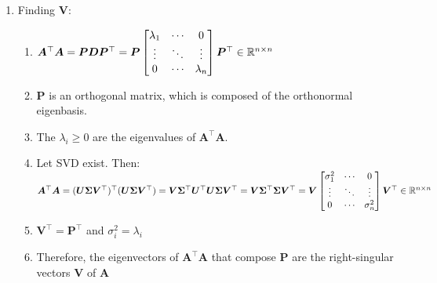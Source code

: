 \begin{enumerate}
    \item Finding $\bm{V}$:
    \begin{enumerate}
        \item $
            \bm{A}^\top \bm{A}
            = \bm{PDP} ^\top
            = \bm{P} \begin{bmatrix}
                \lambda_1 & \cdots & 0 \\
                \vdots & \ddots & \vdots \\
                0 & \cdots & \lambda_n
            \end{bmatrix} \bm{P} ^\top
            \in \mathbb{R}^{n\times n}
        $
        \hfill \cite{mfml/book/mml/Deisenroth-Faisal-Ong}

        \item $\bm{P}$ is an orthogonal matrix, which is composed of the orthonormal eigenbasis.
        \hfill \cite{mfml/book/mml/Deisenroth-Faisal-Ong}

        \item The $\lambda_i \geq 0$ are the eigenvalues of $\bm{A}^\top \bm{A}$.
        \hfill \cite{mfml/book/mml/Deisenroth-Faisal-Ong}

        \item Let SVD exist. Then:
        \hfill \cite{mfml/book/mml/Deisenroth-Faisal-Ong}
        \\
        $
            \bm{A}^\top \bm{A}
            = (\bm{U\Sigma V}^\top)^\top (\bm{U\Sigma V}^\top)
            = \bm{V} \bm{\Sigma}^\top \bm{U}^\top \bm{U\Sigma V}^\top
            = \bm{V} \bm{\Sigma}^\top \bm{\Sigma V}^\top
            = \bm{V} \begin{bmatrix}
                \sigma_1^2 & \cdots & 0 \\
                \vdots & \ddots & \vdots \\
                0 & \cdots & \sigma_n^2
            \end{bmatrix} \bm{V} ^\top
            \in \mathbb{R}^{n\times n}
        $
        \hfill \cite{mfml/book/mml/Deisenroth-Faisal-Ong}

        \item $\bm{V}^\top = \bm{P}^\top$ and $\sigma^2_i = \lambda_i$
        \hfill \cite{mfml/book/mml/Deisenroth-Faisal-Ong}

        \item Therefore, the eigenvectors of $\bm{A}^\top \bm{A}$ that compose $\bm{P}$ are the right-singular vectors $\bm{V}$ of $\bm{A}$
        \hfill \cite{mfml/book/mml/Deisenroth-Faisal-Ong}


\end{enumerate}
\end{enumerate}
